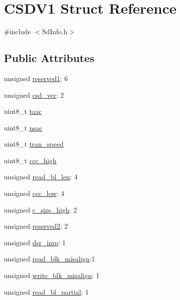 \hypertarget{struct_c_s_d_v1}{}\section{C\+S\+D\+V1 Struct Reference}
\label{struct_c_s_d_v1}


{\ttfamily \#include $<$Sd\+Info.\+h$>$}

\subsection*{Public Attributes}
\begin{DoxyCompactItemize}
\item 
unsigned \hyperlink{struct_c_s_d_v1_a8fc5b7146910eb474d3ea3af5fbc504b}{reserved1}\+: 6
\item 
unsigned \hyperlink{struct_c_s_d_v1_a1bfd31c79faed95a073e55fba80cd21c}{csd\+\_\+ver}\+: 2
\item 
uint8\+\_\+t \hyperlink{struct_c_s_d_v1_a80833a500dfa8f2292514969d7c55fd4}{taac}
\item 
uint8\+\_\+t \hyperlink{struct_c_s_d_v1_aa7089849926dbb8443cc9c499cd4af55}{nsac}
\item 
uint8\+\_\+t \hyperlink{struct_c_s_d_v1_a4f25d134cabce66589599a344c19a868}{tran\+\_\+speed}
\item 
uint8\+\_\+t \hyperlink{struct_c_s_d_v1_ae2d032e1cda297ec9da43c9e8d320606}{ccc\+\_\+high}
\item 
unsigned \hyperlink{struct_c_s_d_v1_ac814673bd138c6e3cffc9cd1f1d89d7c}{read\+\_\+bl\+\_\+len}\+: 4
\item 
unsigned \hyperlink{struct_c_s_d_v1_a5235d1c520e0e02dd7c363cb85163fe7}{ccc\+\_\+low}\+: 4
\item 
unsigned \hyperlink{struct_c_s_d_v1_a1db393dada90b094020d05ee296ae6e4}{c\+\_\+size\+\_\+high}\+: 2
\item 
unsigned \hyperlink{struct_c_s_d_v1_a3b2832468c7e96a55dbe16a7aadcafd3}{reserved2}\+: 2
\item 
unsigned \hyperlink{struct_c_s_d_v1_ada54dc8c3d5ffc12b20160ae241fa623}{dsr\+\_\+imp}\+: 1
\item 
unsigned \hyperlink{struct_c_s_d_v1_aa5f31d46dc26c164663fb16acf1dea34}{read\+\_\+blk\+\_\+misalign}\+:1
\item 
unsigned \hyperlink{struct_c_s_d_v1_a7d2f58a9c9b9447344ce5bdf3a8ffaa3}{write\+\_\+blk\+\_\+misalign}\+: 1
\item 
unsigned \hyperlink{struct_c_s_d_v1_ab0943077d01c440bb15aff025a700197}{read\+\_\+bl\+\_\+partial}\+: 1

\end{DoxyCompactItemize}
